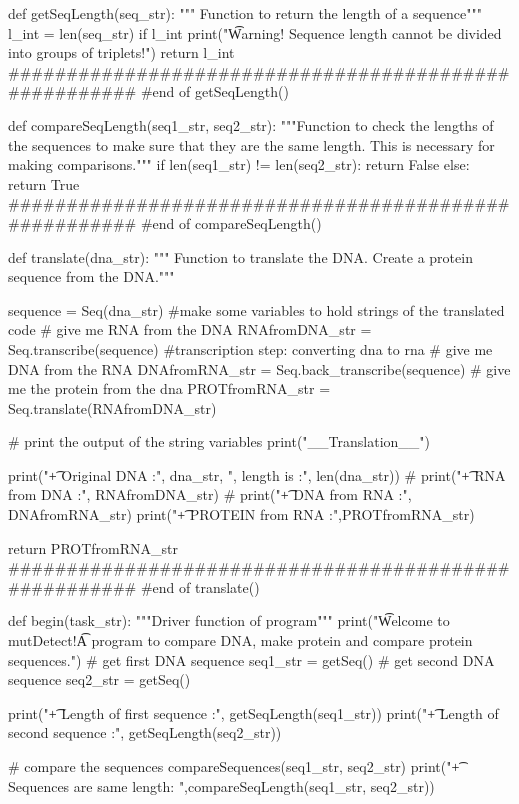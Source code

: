 def getSeqLength(seq_str):
    """ Function to return the length of a sequence"""
    l_int = len(seq_str)
    if l_int %
        print("\t Warning! Sequence length cannot be divided into groups of triplets!")
    return l_int
######################################################
#end of getSeqLength()

def compareSeqLength(seq1_str, seq2_str):
    """Function to check the lengths of the sequences to make sure that they are the same length. This is necessary for making comparisons."""
    if len(seq1_str) != len(seq2_str):
        return False
    else:
        return True
######################################################
#end of compareSeqLength()

def translate(dna_str):
    """ Function to translate the DNA. Create a protein sequence from the DNA."""

    sequence = Seq(dna_str)
    #make some variables to hold strings of the translated code
    # give me RNA from the DNA
    RNAfromDNA_str = Seq.transcribe(sequence) #transcription step: converting dna to rna
    # give me DNA from the RNA
    DNAfromRNA_str = Seq.back_transcribe(sequence)
    # give me the protein from the dna
    PROTfromRNA_str = Seq.translate(RNAfromDNA_str)

    # print the output of the string variables
    print("\n __Translation__")

    print("\t + Original DNA       :", dna_str, ", length is :", len(dna_str))
    # print("\t + RNA from DNA     :", RNAfromDNA_str)
    # print("\t + DNA from RNA     :", DNAfromRNA_str)
    print("\t + PROTEIN from RNA   :",PROTfromRNA_str)

    return PROTfromRNA_str
######################################################
#end of translate()



def begin(task_str):
    """Driver function of program"""
    print("\n\t Welcome to mutDetect!\n\t A program to compare DNA, make protein and compare protein sequences.")
# get first DNA sequence
    seq1_str = getSeq()
# get second DNA sequence
    seq2_str = getSeq()

    print("\t + Length of first sequence  :", getSeqLength(seq1_str))
    print("\t + Length of second sequence :", getSeqLength(seq2_str))

# compare the sequences
    compareSequences(seq1_str, seq2_str)
    print("\t + Sequences are same length: ",compareSeqLength(seq1_str, seq2_str))

